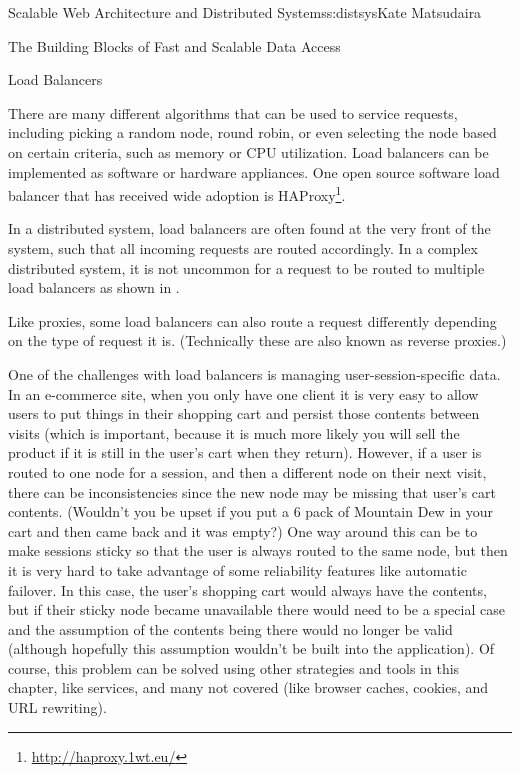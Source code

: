 \begin{aosachapter}{Scalable Web Architecture and Distributed Systems}{s:distsys}{Kate Matsudaira}
\begin{aosasect1}{The Building Blocks of Fast and Scalable Data Access}
\begin{aosasect2}{Load Balancers}

There are many different algorithms that can be used to service
requests, including picking a random node, round robin, or even selecting the node
based on certain criteria, such as memory or CPU utilization. Load balancers can
be implemented as software or hardware appliances. One open source
software load balancer that has received wide adoption is
HAProxy\footnote{\url{http://haproxy.1wt.eu/}}.

In a distributed system, load balancers are often found at the very
front of the system, such that all incoming requests are routed
accordingly. In a complex distributed system, it is not uncommon for a
request to be routed to multiple load balancers as shown in 
.


Like proxies, some load balancers can also route a request
differently depending on the type of request it is. (Technically these are
also known as reverse proxies.)

One of the challenges with load balancers is managing user-session-specific 
data. In an e-commerce site, when you only have one client it
is very easy to allow users to put things in their shopping cart and
persist those contents between visits (which is important, because it
is much more likely you will sell the product if it is still in the
user's cart when they return). However, if a user is routed to one
node for a session, and then a different node on their next visit,
there can be inconsistencies since the new node may be missing that
user's cart contents. (Wouldn't you be upset if you put a 6 pack of
Mountain Dew in your cart and then came back and it was empty?) One way
around this can be to make sessions sticky so that the user is always
routed to the same node, but then it is very hard to take advantage of
some reliability features like automatic failover. In this case, the
user's shopping cart would always have the contents, but if their
sticky node became unavailable there would need to be a special case
and the assumption of the contents being there would no longer be
valid (although hopefully this assumption wouldn't be built into the
application). Of course, this problem can be solved using other
strategies and tools in this chapter, like services, and many not
covered (like browser caches, cookies, and URL rewriting).


\end{aosasect2}
\end{aosasect1}
\end{aosachapter}

